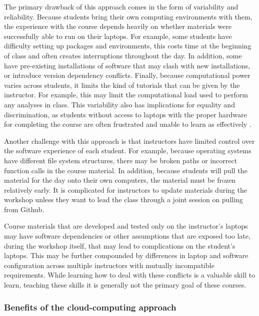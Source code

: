The primary drawback of this approach comes in the form of variability and
reliability. Because students bring their own computing environments with them,
the experience with the course depends heavily on whether materials were
successfully able to run on their laptops. For example, some students have
difficulty setting up packages and environments, this costs time at the
beginning of class and often creates interruptions throughout the day. In
addition, some have pre-existing installations of software that may clash with
new installations, or introduce version dependency conflicts. Finally, because
computational power varies across students, it limits the kind of tutorials that
can be given by the instructor. For example, this may limit the computational
load used to perform any analyses in class. This variability also has
implications for equality and discrimination, as students without access to
laptops with the proper hardware for completing the course are often frustrated
and unable to learn as effectively \cite{clark-proc-scipy-2014}.

Another challenge with this approach is that instructors have limited control
over the software experience of each student. For example, because operating
systems have different file system structures, there may be broken paths or
incorrect function calls in the course material. In addition, because students
will pull the material for the day onto their own computers, the material must
be frozen relatively early. It is complicated for instructors to update
materials during the workshop unless they want to lead the class through a joint
session on pulling from Github.

Course materials that are developed and tested only on the instructor's laptops
may have software dependencies or other assumptions that are exposed too late,
during the workshop itself, that may lead to complications on the student's
laptops. This may be further compounded by differences in laptop and software
configuration across multiple instructors with mutually incompatible
requirements. While learning how to deal with these conflicts is a valuable
skill to learn, teaching these skills it is generally not the primary goal of
these courses.

\subsubsection{Benefits of the cloud-computing approach}

